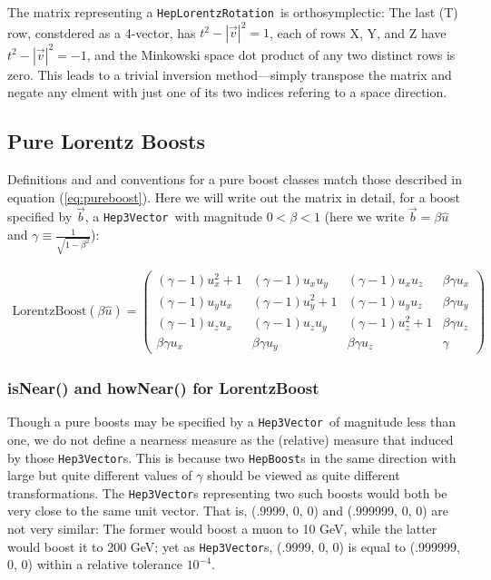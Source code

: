 \documentclass[twoside,12pt]{article}
\def \SV {{\tt Hep3Vector}}
\def \LT {{\tt HepLorentzRotation}}
\def \LB {{\tt HepBoost}}
\begin{document}
The matrix representing a \LT\ is orthosymplectic:  The last (T) row,
constdered as a 4-vector, has $ t^2 - |\vec{v}|^2 = 1 $, each of rows
X, Y, and Z have $ t^2 - |\vec{v}|^2 = -1$, and the Minkowski space
dot product of any two distinct rows
is zero.  This leads to a trivial inversion method---simply transpose the
matrix and negate any elment with just one of its two indices refering to
a space direction.

\subsection{Pure Lorentz Boosts}

Definitions and
and conventions for a pure boost classes match those described in equation
(\ref{eq:pureboost}).
Here we will write out the matrix in detail, for a boost specified by
$\vec{b}$, a \SV\ with magnitude $0 < \beta < 1$ (here we write
$\vec{b} = \beta \hat{u} $ and
$\gamma \equiv \frac{1}{\sqrt{1-\beta^2}}$):

\begin{eqnarray}
\label{eq:boostform}
  \mbox{LorentzBoost}(\beta \hat{u}) =
  \left(
  \begin{array}{cccc}
  (\gamma - 1) u_x^2 + 1 & (\gamma - 1) u_x u_y &
  (\gamma - 1) u_x u_z & \beta \gamma u_x
	\\
  (\gamma - 1) u_y u_x & (\gamma - 1) u_y^2 + 1 &
  (\gamma - 1) u_y u_z & \beta \gamma u_y
	\\
  (\gamma - 1) u_z u_x & (\gamma - 1) u_z u_y &
  (\gamma - 1) u_z^2 + 1 & \beta \gamma u_z
	\\
  \beta \gamma u_x & \beta \gamma u_y & 
  \beta \gamma u_z & \gamma
  \end{array}
  \right)
\end{eqnarray}

\subsubsection{isNear() and howNear() for LorentzBoost}

Though a pure boosts may be specified by a \SV\ of magnitude less than one,
we do not define a nearness measure as the (relative) measure that induced
by those \SV s.  This is because two \LB s in the same direction
with large but quite different
values of $\gamma$ should be viewed as quite different transformations.
The \SV s representing two such boosts would both be very close to the same
unit vector.  That is, (.9999, 0, 0) and (.999999, 0, 0) are not very similar:
The former would boost a muon to 10 GeV, while the latter would boost it to
200 GeV; yet as \SV s, (.9999, 0, 0) is equal to (.999999, 0, 0) within
a relative tolerance $10^{-4}$.
\end{document}
